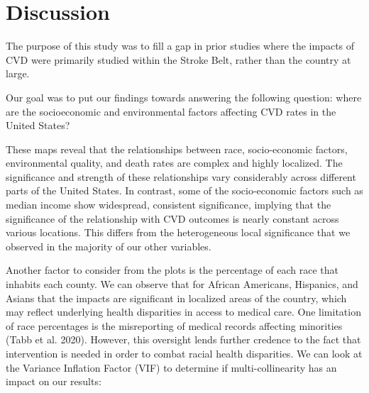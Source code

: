\documentclass[
]{article}
\begin{document}
\section{Discussion}\label{discussion}

The purpose of this study was to fill a gap in prior studies where the
impacts of CVD were primarily studied within the Stroke Belt, rather
than the country at large.

Our goal was to put our findings towards answering the following
question: where are the socioeconomic and environmental factors
affecting CVD rates in the United States?

These maps reveal that the relationships between race, socio-economic
factors, environmental quality, and death rates are complex and highly
localized. The significance and strength of these relationships vary
considerably across different parts of the United States. In contrast,
some of the socio-economic factors such as median income show
widespread, consistent significance, implying that the significance of
the relationship with CVD outcomes is nearly constant across various
locations. This differs from the heterogeneous local significance that
we observed in the majority of our other variables.

Another factor to consider from the plots is the percentage of each race
that inhabits each county. We can observe that for African Americans,
Hispanics, and Asians that the impacts are significant in localized
areas of the country, which may reflect underlying health disparities in
access to medical care. One limitation of race percentages is the
misreporting of medical records affecting minorities (Tabb et al. 2020).
However, this oversight lends further credence to the fact that
intervention is needed in order to combat racial health disparities. We
can look at the Variance Inflation Factor (VIF) to determine if
multi-collinearity has an impact on our results:

\begin{table}

\caption{\label{tbl-10}}


\end{table}%
\end{document}
